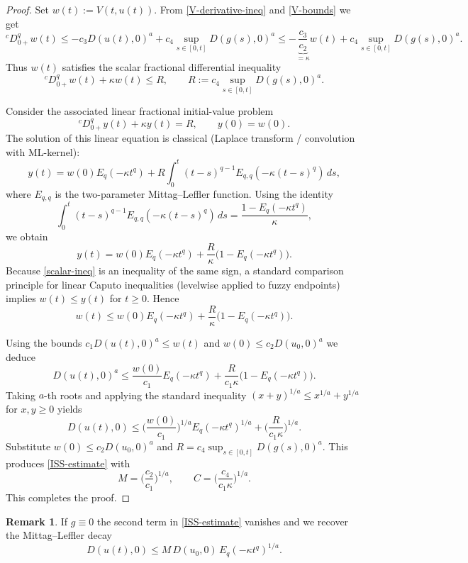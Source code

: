 \documentclass[11pt,a4paper]{article}
\theoremstyle{plain}
\theoremstyle{definition}
\newtheorem{remark}[theorem]{Remark}
\theoremstyle{remark}
\newcommand{\Haus}{D}
\begin{document}
	\begin{proof}
		Set \(w(t):=V(t,u(t))\). From \eqref{V-derivative-ineq} and \eqref{V-bounds} we get
		\[
		{}^cD_{0+}^q w(t)\le -c_3\Haus(u(t),0)^a + c_4\sup_{s\in[0,t]}\Haus(g(s),0)^a
		\le -\underbrace{\frac{c_3}{c_2}}_{=\kappa} w(t) + c_4\sup_{s\in[0,t]}\Haus(g(s),0)^a.
		\]
		Thus \(w(t)\) satisfies the scalar fractional differential inequality
		\begin{equation}\label{scalar-ineq}
			{}^cD_{0+}^q w(t) + \kappa w(t) \le R,\qquad R:=c_4\sup_{s\in[0,t]}\Haus(g(s),0)^a.
		\end{equation}
		
		Consider the associated linear fractional initial-value problem
		\[
		{}^cD_{0+}^q y(t) + \kappa y(t) = R,\qquad y(0)=w(0).
		\]
		The solution of this linear equation is classical (Laplace transform / convolution with ML-kernel):
		\[
		y(t)=w(0)E_q(-\kappa t^q)+R\int_0^t (t-s)^{q-1}E_{q,q}(-\kappa(t-s)^q)\,ds,
		\]
		where \(E_{q,q}\) is the two-parameter Mittag--Leffler function. Using the identity
		\[
		\int_0^t (t-s)^{q-1}E_{q,q}(-\kappa(t-s)^q)\,ds=\frac{1-E_q(-\kappa t^q)}{\kappa},
		\]
		we obtain
		\[
		y(t)=w(0)E_q(-\kappa t^q)+\frac{R}{\kappa}\big(1-E_q(-\kappa t^q)\big).
		\]
		Because \eqref{scalar-ineq} is an inequality of the same sign, a standard comparison principle for linear Caputo inequalities (levelwise applied to fuzzy endpoints) implies \(w(t)\le y(t)\) for \(t\ge0\). Hence
		\[
		w(t)\le w(0)E_q(-\kappa t^q)+\frac{R}{\kappa}\big(1-E_q(-\kappa t^q)\big).
		\]
		
		Using the bounds \(c_1\Haus(u(t),0)^a \le w(t)\) and \(w(0)\le c_2\Haus(u_0,0)^a\) we deduce
		\[
		\Haus(u(t),0)^a \le \frac{w(0)}{c_1}E_q(-\kappa t^q)+\frac{R}{c_1\kappa}\big(1-E_q(-\kappa t^q)\big).
		\]
		Taking \(a\)-th roots and applying the standard inequality \((x+y)^{1/a}\le x^{1/a}+y^{1/a}\) for \(x,y\ge0\) yields
		\[
		\Haus(u(t),0)\le \Big(\frac{w(0)}{c_1}\Big)^{1/a}E_q(-\kappa t^q)^{1/a}+\Big(\frac{R}{c_1\kappa}\Big)^{1/a}.
		\]
		Substitute \(w(0)\le c_2\Haus(u_0,0)^a\) and \(R=c_4\sup_{s\in[0,t]}\Haus(g(s),0)^a\). This produces \eqref{ISS-estimate} with
		\[
		M=\Big(\frac{c_2}{c_1}\Big)^{1/a},\qquad C=\Big(\frac{c_4}{c_1\kappa}\Big)^{1/a}.
		\]
		This completes the proof.
	\end{proof}
	
	\begin{remark}
		If \(g\equiv0\) the second term in \eqref{ISS-estimate} vanishes and we recover the Mittag--Leffler decay
		\[
		\Haus(u(t),0)\le M\,\Haus(u_0,0)\,E_q(-\kappa t^q)^{1/a}.
		\]
	\end{remark}
	
\end{document}
